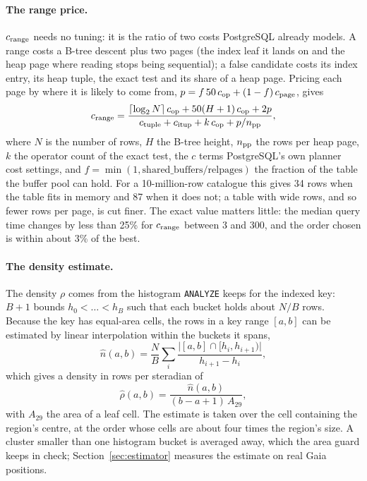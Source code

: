 \documentclass[final,5p,times,twocolumn,authoryear]{elsarticle}
\newcommand{\Sect}{Section}
\begin{document}
\paragraph{The range price.}
\label{sec:calib}
$c_{\rm range}$ needs no tuning: it is the ratio of two costs PostgreSQL already
models. A range costs a B-tree descent plus two pages (the index leaf it lands on and
the heap page where reading stops being sequential); a false candidate costs its index
entry, its heap tuple, the exact test and its share of a heap page. Pricing each page by where it is likely to come from,
$p = f\,50\,c_{\rm op} + (1-f)\,c_{\rm page}$, gives
\begin{equation}
  c_{\rm range} = \frac{\lceil\log_2 N\rceil\,c_{\rm op} + 50(H+1)\,c_{\rm op} + 2p}
    {c_{\rm tuple} + c_{\rm itup} + k\,c_{\rm op} + p/n_{\rm pp}},
  \label{eq:crange}
\end{equation}
where $N$ is the number of rows, $H$ the B-tree height, $n_{\rm pp}$ the rows per heap
page, $k$ the operator count of the exact test, the $c$ terms PostgreSQL's own planner
cost settings, and $f=\min(1,\mathrm{shared\_buffers}/\mathrm{relpages})$ the fraction
of the table the buffer pool can hold. For a 10-million-row catalogue this gives 34 rows
when the table fits in memory and 87 when it does not; a table with wide rows, and so
fewer rows per page, is cut finer. The exact value matters little: the median query time changes by less
than 25\% for $c_{\rm range}$ between 3 and 300, and the order chosen is within about 3\%
of the best.

\paragraph{The density estimate.}
\label{sec:density}
The density $\rho$ comes from the histogram \texttt{ANALYZE} keeps for the indexed key:
$B+1$ bounds $h_0<\dots<h_B$ such that each bucket holds about $N/B$ rows. Because the
key has equal-area cells, the rows in a key range $[a,b]$ can be estimated by linear
interpolation within the buckets it spans,
\begin{equation}
  \hat{n}(a,b) = \frac{N}{B}\sum_{i} \frac{\bigl|[a,b] \cap [h_i, h_{i+1})\bigr|}{h_{i+1}-h_i},
  \label{eq:hist}
\end{equation}
which gives a density in rows per steradian of
\begin{equation}
  \hat{\rho}(a,b) = \frac{\hat{n}(a,b)}{(b-a+1)\,A_{29}},
  \label{eq:rho}
\end{equation}
with $A_{29}$ the area of a leaf cell. The estimate is taken over the cell containing the
region's centre, at the order whose cells are about four times the region's size. A
cluster smaller than one histogram bucket is averaged away, which the area guard keeps
in check; \Sect~\ref{sec:estimator} measures the estimate on real Gaia positions.
\end{document}
